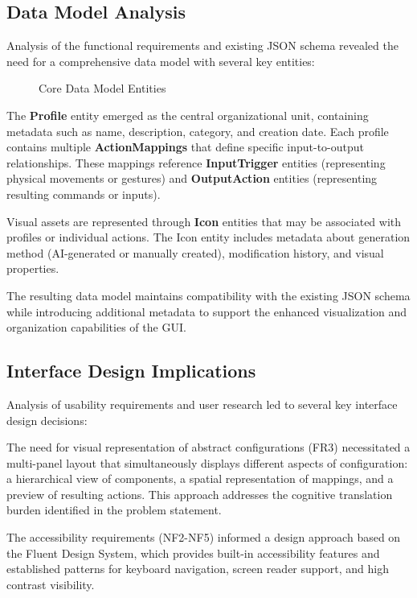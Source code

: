 \subsection{Data Model Analysis}
Analysis of the functional requirements and existing JSON schema revealed the need for a comprehensive data model with several key entities:

\begin{figure}[h]
\centering
\caption{Core Data Model Entities}
\label{fig:data_model}
\end{figure}

The \textbf{Profile} entity emerged as the central organizational unit, containing metadata such as name, description, category, and creation date. Each profile contains multiple \textbf{ActionMappings} that define specific input-to-output relationships. These mappings reference \textbf{InputTrigger} entities (representing physical movements or gestures) and \textbf{OutputAction} entities (representing resulting commands or inputs).

Visual assets are represented through \textbf{Icon} entities that may be associated with profiles or individual actions. The Icon entity includes metadata about generation method (AI-generated or manually created), modification history, and visual properties.

The resulting data model maintains compatibility with the existing JSON schema while introducing additional metadata to support the enhanced visualization and organization capabilities of the GUI.

\subsection{Interface Design Implications}
Analysis of usability requirements and user research led to several key interface design decisions:

The need for visual representation of abstract configurations (FR3) necessitated a multi-panel layout that simultaneously displays different aspects of configuration: a hierarchical view of components, a spatial representation of mappings, and a preview of resulting actions. This approach addresses the cognitive translation burden identified in the problem statement.

The accessibility requirements (NF2-NF5) informed a design approach based on the Fluent Design System, which provides built-in accessibility features and established patterns for keyboard navigation, screen reader support, and high contrast visibility.


